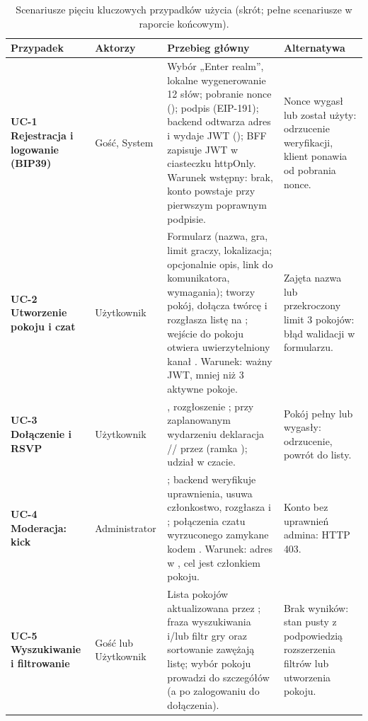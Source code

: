 \begin{table}[H]
\centering\footnotesize
\renewcommand{\arraystretch}{1.25}
\begin{tabularx}{\textwidth}{@{}>{\bfseries}p{}p{}YY@{}}
\toprule
\textbf{Przypadek} & \textbf{Aktorzy} & \textbf{Przebieg główny} & \textbf{Alternatywa} \\
\midrule
UC-1 Rejestracja i logowanie (BIP39) & Gość, System &
  Wybór „Enter realm”, lokalne wygenerowanie 12 słów; pobranie nonce
  (); podpis  (EIP-191); backend
  odtwarza adres i wydaje JWT (); BFF zapisuje JWT w ciasteczku
  httpOnly. Warunek wstępny: brak, konto powstaje przy pierwszym poprawnym podpisie. &
  Nonce wygasł lub został użyty: odrzucenie weryfikacji, klient ponawia od pobrania
  nonce. \\
\addlinespace
UC-2 Utworzenie pokoju i czat & Użytkownik &
  Formularz (nazwa, gra, limit graczy, lokalizacja; opcjonalnie opis, link do
  komunikatora, wymagania);  tworzy pokój, dołącza twórcę i rozgłasza
  listę na ; wejście do pokoju otwiera uwierzytelniony kanał
  . Warunek: ważny JWT, mniej niż 3 aktywne pokoje. &
  Zajęta nazwa lub przekroczony limit 3 pokojów: błąd walidacji w formularzu. \\
\addlinespace
UC-3 Dołączenie i RSVP & Użytkownik &
  , rozgłoszenie ; przy zaplanowanym
  wydarzeniu deklaracja // przez
   (ramka ); udział w czacie. &
  Pokój pełny lub wygasły: odrzucenie, powrót do listy. \\
\addlinespace
UC-4 Moderacja: kick & Administrator &
  ; backend weryfikuje uprawnienia,
  usuwa członkostwo, rozgłasza  i ; połączenia
  czatu wyrzuconego zamykane kodem . Warunek: adres w
  , cel jest członkiem pokoju. &
  Konto bez uprawnień admina: HTTP 403. \\
\addlinespace
UC-5 Wyszukiwanie i filtrowanie & Gość lub Użytkownik &
  Lista pokojów aktualizowana przez ; fraza wyszukiwania i/lub filtr
  gry oraz sortowanie zawężają listę; wybór pokoju prowadzi do szczegółów (a po
  zalogowaniu do dołączenia). &
  Brak wyników: stan pusty z podpowiedzią rozszerzenia filtrów lub utworzenia pokoju. \\
\bottomrule
\end{tabularx}
\caption{Scenariusze pięciu kluczowych przypadków użycia (skrót; pełne scenariusze w
raporcie końcowym).}
\label{tab:arch-uc}
\end{table}

